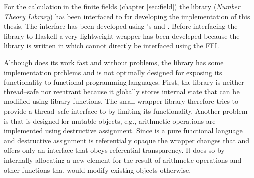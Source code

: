 %
%
\label{sec:implementation-details}

\label{sec:finite-field-calcs}

For the calculation in the finite fields (chapter \ref{sec:field}) the \JWTcpp{}
library \JWTLntl{} (\emph{Number Theory Library}) has been interfaced to
\JWThaskell{} for developing the implementation of this thesis. The interface
has been developed using \JWThaskell{}'s 
\cite{haskell2010} and  \cite{c2hs}.
Before interfacing the library to Haskell a very lightweight \JWTc{} wrapper
has been developed because the library is written in \JWTcpp{} which cannot
directly be interfaced using the FFI.

Although \JWTntl{} does its work fast and without problems, the library has some
implementation problems and is not optimally designed for exposing its
functionality to functional programming languages. First, the library is
neither thread--safe nor reentrant because it globally stores internal state
that can be modified using library functions. The small \JWTc{} wrapper library
therefore tries to provide a thread--safe interface to \JWTntl{} by limiting its
functionality.  Another problem is that \JWTntl{} is designed for mutable
objects, e.g., arithmetic operations are implemented using destructive
assignment.  Since \JWThaskell{} is a pure functional language
\cite{haskell2010} and destructive assignment is referentially opaque the
\JWTc{} wrapper changes that and offers only an interface that obeys referential
transparency. It does so by internally allocating a new element for the result
of arithmetic operations and other functions that would modify existing objects
otherwise.

